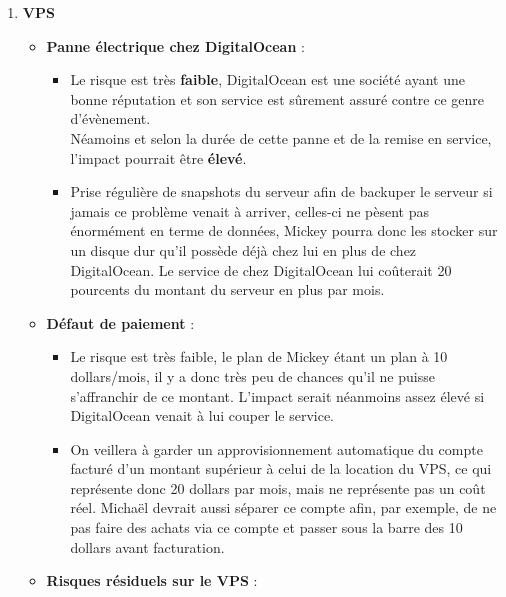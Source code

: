 \documentclass[a4paper,10pt,final,fleqn]{article}
\begin{document}
				\begin{enumerate}
					\item \textbf{VPS}

						\begin{itemize}
							\item \textbf{Panne électrique chez DigitalOcean} : \\
								\begin{itemize}
									\item Le risque est très \textbf{faible}, DigitalOcean est une société ayant une bonne réputation et son service est sûrement assuré contre ce genre d'évènement.\\ Néamoins et selon la durée de cette panne et de la remise en service, l'impact pourrait être \textbf{élevé}.

									\item Prise régulière de snapshots du serveur afin de backuper le serveur si jamais ce problème venait à arriver, celles-ci ne pèsent pas énormément en terme de données, Mickey pourra donc les stocker sur un disque dur qu'il possède déjà chez lui en plus de chez DigitalOcean. Le service de chez DigitalOcean lui coûterait 20 pourcents du montant du serveur en plus par mois.\\
								\end{itemize}
							
							\item \textbf{Défaut de paiement} : \\
								\begin{itemize}
									\item Le risque est très faible, le plan de Mickey étant un plan à 10 dollars/mois, il y a donc très peu de chances qu'il ne puisse s'affranchir de ce montant. L'impact serait néanmoins assez élevé si DigitalOcean venait à lui couper le service.

									\item On veillera à garder un approvisionnement automatique du compte facturé d'un montant supérieur à celui de la location du VPS, ce qui représente donc 20 dollars par mois, mais ne représente pas un coût réel. Michaël devrait aussi séparer ce compte afin, par exemple, de ne pas faire des achats via ce compte et passer sous la barre des 10 dollars avant facturation.\\
								\end{itemize}
						

							\item \textbf{Risques résiduels sur le VPS} : \\


\end{itemize}
\end{enumerate}
\end{document}
